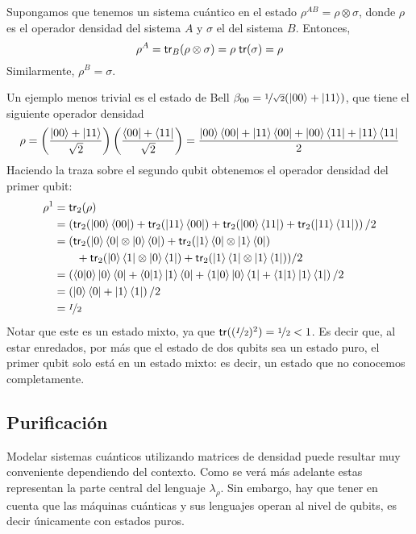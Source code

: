 \begin{ejemplos}
  Supongamos que tenemos un sistema cuántico en el estado
  $\rho^{AB}=\rho\otimes\sigma$, donde $\rho$ es el operador densidad del
  sistema $A$ y $\sigma$ el del sistema $B$. Entonces,
  \[
    \rho^A = \mathsf{tr}_B(\rho\otimes\sigma)=\rho\;\mathsf{tr}(\sigma)=\rho
  \]
  Similarmente, $\rho^B=\sigma$.

  Un ejemplo menos trivial es el estado de Bell \(\beta_{00}=\nicefrac 1{\sqrt
    2}(\ket{00}+\ket{11})\), que tiene el siguiente operador densidad
  \[
    \rho=\left(\frac{\ket{00}+\ket{11}}{\sqrt 2}\right)
    \left(\frac{\bra{00}+\bra{11}}{\sqrt 2}\right)
    =\frac{\ket{00}\bra{00}+\ket{11}\bra{00}+\ket{00}\bra{11}+\ket{11}\bra{11}}2
  \]
  Haciendo la traza sobre el segundo qubit obtenemos el operador densidad del primer qubit:
  \begin{align*}
    \rho^1 
    &= \mathsf{tr}_2(\rho)\\&=\left(\mathsf{tr}_2(\ket{00}\bra{00})+\mathsf{tr}_2(\ket{11}\bra{00})+\mathsf{tr}_2(\ket{00}\bra{11})+\mathsf{tr}_2(\ket{11}\bra{11})\right)/2\\
    &=(\mathsf{tr}_2(\ket 0\bra 0\otimes\ket 0\bra 0)+\mathsf{tr}_2(\ket 1\bra 0\otimes\ket 1\bra 0)\\
    &\qquad +\mathsf{tr}_2(\ket 0\bra 1\otimes\ket 0\bra 1)+\mathsf{tr}_2(\ket 1\bra 1\otimes\ket 1\bra 1))/2\\
    &=\left(\braket{0|0}\ket 0\bra 0+\braket{0|1}\ket 1\bra 0+\braket{1|0}\ket 0\bra 1+\braket{1|1}\ket 1\bra 1\right)/2\\
    &=\left(\ket 0\bra 0+\ket 1\bra 1\right)/2\\
    &=\nicefrac I2
  \end{align*}
  Notar que este es un estado mixto, ya que $\mathsf{tr}((\nicefrac I2)^2) = \nicefrac 12<1$. Es decir que, al estar enredados, por más que el estado de dos qubits
  sea un estado puro, el primer qubit solo está en un estado mixto: es decir, un
  estado que no conocemos completamente.
\end{ejemplos}

\subsection{Purificación}
Modelar sistemas cuánticos utilizando matrices de densidad puede resultar muy conveniente dependiendo del contexto. Como se verá más adelante estas representan la parte central del lenguaje $\lambda_\rho$. Sin embargo, hay que tener en cuenta que las máquinas cuánticas y sus lenguajes operan al nivel de qubits, es decir únicamente con estados puros.

